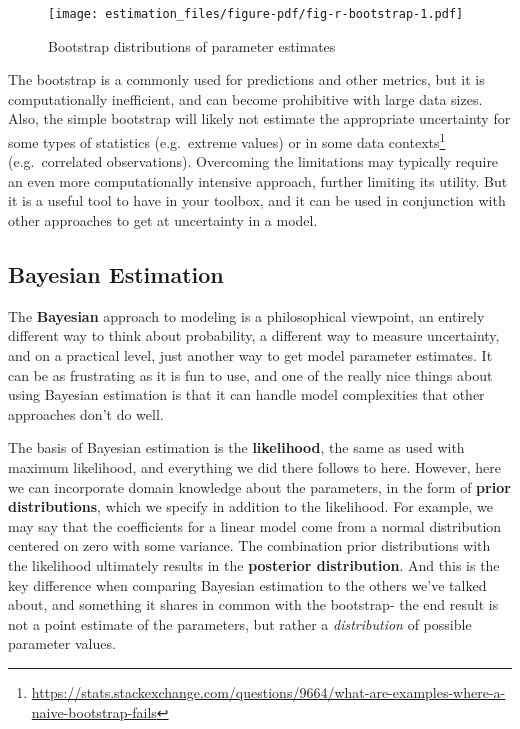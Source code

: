 \documentclass[
  letterpaper,
]{krantz}
\DeclareRobustCommand{\href}[2]{#2\footnote{\url{#1}}}
\begin{document}
\begin{figure}

{\centering \texttt{[image: estimation\_files/figure-pdf/fig-r-bootstrap-1.pdf]}

}

\caption{\label{fig-r-bootstrap}Bootstrap distributions of parameter
estimates}

\end{figure}

The bootstrap is a commonly used for predictions and other metrics, but
it is computationally inefficient, and can become prohibitive with large
data sizes. Also, the simple bootstrap will likely not estimate the
appropriate uncertainty for some types of statistics (e.g.~extreme
values) or
\href{https://stats.stackexchange.com/questions/9664/what-are-examples-where-a-naive-bootstrap-fails}{in
some data contexts} (e.g.~correlated observations). Overcoming the
limitations may typically require an even more computationally intensive
approach, further limiting its utility. But it is a useful tool to have
in your toolbox, and it can be used in conjunction with other approaches
to get at uncertainty in a model.

\subsection{Bayesian Estimation}\label{sec-estim-bayes}

The \textbf{Bayesian} approach to modeling is a philosophical viewpoint,
an entirely different way to think about probability, a different way to
measure uncertainty, and on a practical level, just another way to get
model parameter estimates. It can be as frustrating as it is fun to use,
and one of the really nice things about using Bayesian estimation is
that it can handle model complexities that other approaches don't do
well.

The basis of Bayesian estimation is the \textbf{likelihood}, the same as
used with maximum likelihood, and everything we did there follows to
here. However, here we can incorporate domain knowledge about the
parameters, in the form of \textbf{prior distributions}, which we
specify in addition to the likelihood. For example, we may say that the
coefficients for a linear model come from a normal distribution centered
on zero with some variance. The combination prior distributions with the
likelihood ultimately results in the \textbf{posterior distribution}.
And this is the key difference when comparing Bayesian estimation to the
others we've talked about, and something it shares in common with the
bootstrap- the end result is not a point estimate of the parameters, but
rather a \emph{distribution} of possible parameter values.
\end{document}
